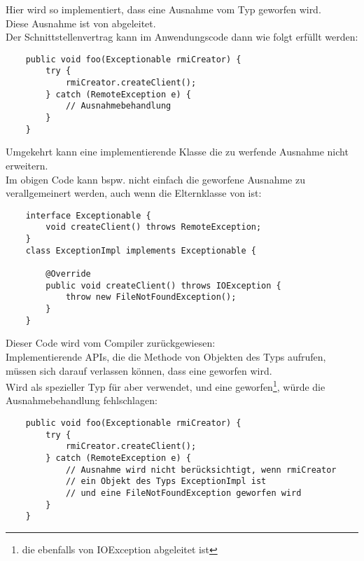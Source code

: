 Hier wird  so implementiert, dass eine Ausnahme vom Typ  geworfen wird.\\
Diese Ausnahme ist von  abgeleitet.\\

\noindent
Der Schnittstellenvertrag kann im Anwendungscode dann wie folgt erfüllt werden:

\begin{verbatim}
    public void foo(Exceptionable rmiCreator) {
        try {
            rmiCreator.createClient();
        } catch (RemoteException e) {
            // Ausnahmebehandlung
        }
    }
\end{verbatim}

\noindent
Umgekehrt kann eine implementierende Klasse die zu werfende Ausnahme nicht erweitern.\\
Im obigen Code kann bspw. nicht einfach die geworfene Ausnahme zu  verallgemeinert werden, auch wenn  die Elternklasse von   ist:

\begin{verbatim}
    interface Exceptionable {
        void createClient() throws RemoteException;
    }
    class ExceptionImpl implements Exceptionable {

        @Override
        public void createClient() throws IOException {
            throw new FileNotFoundException();
        }
    }
\end{verbatim}

\noindent
Dieser Code wird vom Compiler zurückgewiesen:\\
Implementierende APIs, die die Methode  von Objekten des Typs  aufrufen, müssen sich darauf verlassen können, dass eine  geworfen wird.\\
Wird als spezieller Typ für  aber  verwendet, und eine  geworfen\footnote{die ebenfalls von IOException abgeleitet ist}, würde die Ausnahmebehandlung fehlschlagen:

\begin{verbatim}
    public void foo(Exceptionable rmiCreator) {
        try {
            rmiCreator.createClient();
        } catch (RemoteException e) {
            // Ausnahme wird nicht berücksichtigt, wenn rmiCreator
            // ein Objekt des Typs ExceptionImpl ist
            // und eine FileNotFoundException geworfen wird
        }
    }
\end{verbatim}

